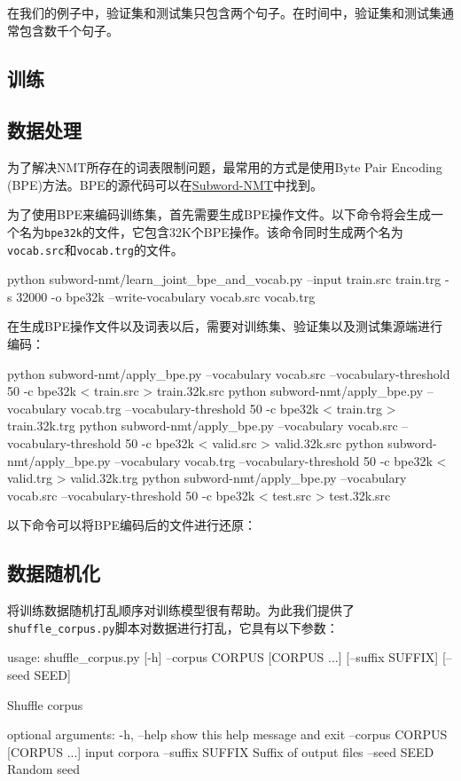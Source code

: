 \documentclass{article}
\begin{document}
在我们的例子中，验证集和测试集只包含两个句子。在时间中，验证集和测试集通常包含数千个句子。

\subsection{训练}

\subsection{数据处理}
为了解决NMT所存在的词表限制问题，最常用的方式是使用Byte Pair Encoding (BPE)方法。BPE的源代码可以在\href{https://github.com/rsennrich/subword-nmt}{Subword-NMT}中找到。

为了使用BPE来编码训练集，首先需要生成BPE操作文件。以下命令将会生成一个名为\verb|bpe32k|的文件，它包含32K个BPE操作。该命令同时生成两个名为\verb|vocab.src|和\verb|vocab.trg|的文件。
\begin{everbatim}
python subword-nmt/learn_joint_bpe_and_vocab.py
  --input train.src train.trg -s 32000 -o bpe32k
  --write-vocabulary vocab.src vocab.trg
\end{everbatim}

在生成BPE操作文件以及词表以后，需要对训练集、验证集以及测试集源端进行编码：
\begin{everbatim}
  python subword-nmt/apply_bpe.py
    --vocabulary vocab.src
    --vocabulary-threshold 50
    -c bpe32k < train.src > train.32k.src
  python subword-nmt/apply_bpe.py
    --vocabulary vocab.trg
    --vocabulary-threshold 50
    -c bpe32k < train.trg > train.32k.trg
  python subword-nmt/apply_bpe.py
    --vocabulary vocab.src
    --vocabulary-threshold 50
    -c bpe32k < valid.src > valid.32k.src
  python subword-nmt/apply_bpe.py
    --vocabulary vocab.trg --vocabulary-threshold 50
    -c bpe32k < valid.trg > valid.32k.trg
  python subword-nmt/apply_bpe.py
    --vocabulary vocab.src
    --vocabulary-threshold 50
    -c bpe32k < test.src > test.32k.src
\end{everbatim}

以下命令可以将BPE编码后的文件进行还原：


\subsection{数据随机化}
将训练数据随机打乱顺序对训练模型很有帮助。为此我们提供了\verb|shuffle_corpus.py|脚本对数据进行打乱，它具有以下参数：
\begin{everbatim}
usage: shuffle_corpus.py [-h] --corpus CORPUS [CORPUS ...]
                         [--suffix SUFFIX]
                         [--seed SEED]

Shuffle corpus

optional arguments:
  -h, --help            show this help message and exit
  --corpus CORPUS [CORPUS ...]
                        input corpora
  --suffix SUFFIX       Suffix of output files
  --seed SEED           Random seed
\end{everbatim}
\end{document}

